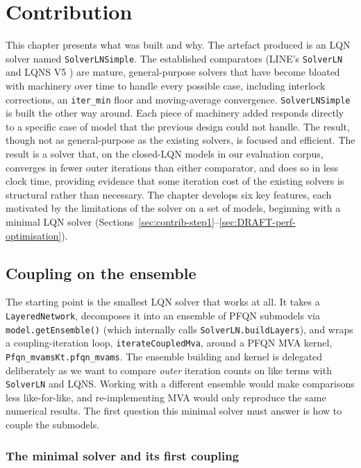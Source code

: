 \chapter{Contribution}
\label{ch:contrib}

This chapter presents what was built and why. The artefact produced is an LQN solver named \texttt{SolverLNSimple}. The established comparators (LINE's \texttt{SolverLN} \cite{casale2024} and LQNS V5 \cite{franks2009,franks2022manual}) are mature, general-purpose solvers that have become bloated with machinery over time to handle every possible case, including interlock corrections, an \texttt{iter\_min} floor and moving-average convergence. \texttt{SolverLNSimple} is built the other way around. Each piece of machinery added responds directly to a specific case of model that the previous design could not handle. The result, though not as general-purpose as the existing solvers, is focused and efficient. The result is a solver that, on the closed-LQN models in our evaluation corpus, converges in fewer outer iterations than either comparator, and does so in less clock time, providing evidence that some iteration cost of the existing solvers is structural rather than necessary. The chapter develops six key features, each motivated by the limitations of the solver on a set of models, beginning with a minimal LQN solver (Sections~\ref{sec:contrib-step1}--\ref{sec:DRAFT-perf-optimisation}).

\section{Coupling on the ensemble}
\label{sec:contrib-baseline}
\label{sec:contrib-step1}

The starting point is the smallest LQN solver that works at all. It takes a \texttt{LayeredNetwork}, decomposes it into an ensemble of PFQN submodels via \texttt{model.getEnsemble()} (which internally calls \texttt{SolverLN.buildLayers}), and wraps a coupling-iteration loop, \texttt{iterateCoupledMva}, around a PFQN MVA kernel, \texttt{Pfqn\_mvamsKt.pfqn\_mvams}. The ensemble building and kernel is delegated deliberately as we want to compare \textit{outer} iteration counts on like terms with \texttt{SolverLN} and LQNS. Working with a different ensemble would make comparisons less like-for-like, and re-implementing MVA would only reproduce the same numerical results. The first question this minimal solver must answer is how to couple the submodels.

\subsection{The minimal solver and its first coupling}

